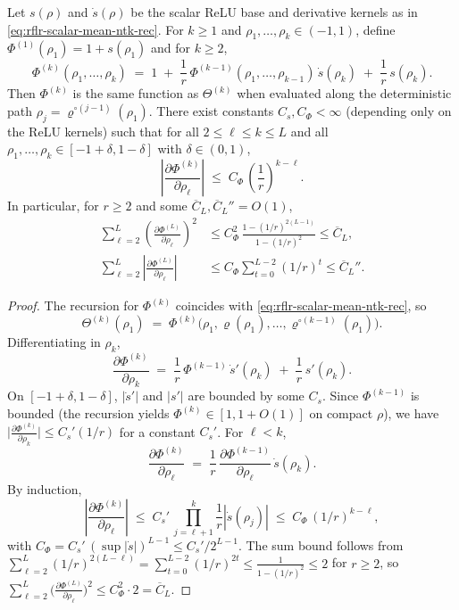 \begin{lemma}\label{lem:path-kernel-sensitivity}
Let \(s(\rho)\) and \(\dot{s}(\rho)\) be the scalar ReLU base and derivative kernels as in \eqref{eq:rflr-scalar-mean-ntk-rec}. For \(k\ge 1\) and \(\rho_1,\ldots,\rho_k\in(-1,1)\), define \(\Phi^{(1)}(\rho_1)=1+s(\rho_1)\) and for \(k\ge 2\),
\[
\Phi^{(k)}(\rho_1,\ldots,\rho_k) \;=\; 1 \;+\; \frac{1}{r}\,\Phi^{(k-1)}(\rho_1,\ldots,\rho_{k-1})\,\dot{s}(\rho_k) \;+\; \frac{1}{r}\,s(\rho_k).
\]
Then \(\Phi^{(k)}\) is the same function as \(\Theta^{(k)}\) when evaluated along the deterministic path \(\rho_j=\varrho^{\circ(j-1)}(\rho_1)\). There exist constants \(C_s,C_\Phi<\infty\) (depending only on the ReLU kernels) such that for all \(2\le \ell\le k\le L\) and all \(\rho_1,\ldots,\rho_k\in[-1+\delta,1-\delta]\) with \(\delta\in(0,1)\),
\[
\left|\frac{\partial\Phi^{(k)}}{\partial\rho_\ell}\right|
\;\le\; C_\Phi\,\left(\frac{1}{r}\right)^{k-\ell}.
\]
In particular, for \(r\ge 2\) and some \(\overline{C}_L,\overline{C}_L''=O(1)\),
\begin{align*}
\sum_{\ell=2}^L \left(\frac{\partial\Phi^{(L)}}{\partial\rho_\ell}\right)^{\!2} &\le C_\Phi^2\,\frac{1-(1/r)^{2(L-1)}}{1-(1/r)^2} \le \overline{C}_L, \\
\sum_{\ell=2}^L \left|\frac{\partial\Phi^{(L)}}{\partial\rho_\ell}\right| &\le C_\Phi\sum_{t=0}^{L-2}(1/r)^t \le \overline{C}_L''.
\end{align*}
\end{lemma}
\begin{proof}
The recursion for \(\Phi^{(k)}\) coincides with \eqref{eq:rflr-scalar-mean-ntk-rec}, so
\[
\Theta^{(k)}(\rho_1) \;=\; \Phi^{(k)}\bigl(\rho_1,\varrho(\rho_1),\ldots,\varrho^{\circ(k-1)}(\rho_1)\bigr).
\]
Differentiating in \(\rho_k\),
\[
\frac{\partial\Phi^{(k)}}{\partial\rho_k} \;=\; \frac{1}{r}\,\Phi^{(k-1)}\,\dot{s}'(\rho_k) \;+\; \frac{1}{r}\,s'(\rho_k).
\]
On \([-1+\delta,1-\delta]\), \(|\dot{s}'|\) and \(|s'|\) are bounded by some \(C_s\). Since \(\Phi^{(k-1)}\) is bounded (the recursion yields \(\Phi^{(k)}\in[1,1+O(1)]\) on compact \(\rho\)), we have \(\bigl|\frac{\partial\Phi^{(k)}}{\partial\rho_k}\bigr|\le C_s'(1/r)\) for a constant \(C_s'\). For \(\ell<k\),
\[
\frac{\partial\Phi^{(k)}}{\partial\rho_\ell} \;=\; \frac{1}{r}\,\frac{\partial\Phi^{(k-1)}}{\partial\rho_\ell}\,\dot{s}(\rho_k).
\]
By induction,
\[
\left|\frac{\partial\Phi^{(k)}}{\partial\rho_\ell}\right| \;\le\; C_s'\,\prod_{j=\ell+1}^k \frac{1}{r}|\dot{s}(\rho_j)| \;\le\; C_\Phi\,(1/r)^{k-\ell},
\]
with \(C_\Phi=C_s'\,(\sup|\dot{s}|)^{L-1}\le C_s'/2^{L-1}\). The sum bound follows from \(\sum_{\ell=2}^L (1/r)^{2(L-\ell)}=\sum_{t=0}^{L-2}(1/r)^{2t}\le \frac{1}{1-(1/r)^2}\le 2\) for \(r\ge 2\), so \(\sum_{\ell=2}^L \bigl(\frac{\partial\Phi^{(L)}}{\partial\rho_\ell}\bigr)^2\le C_\Phi^2\cdot 2=\overline{C}_L\).
\end{proof}

